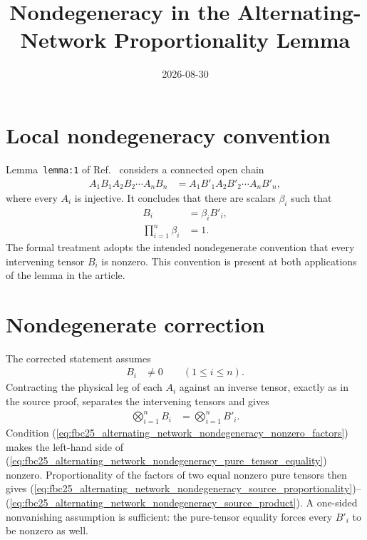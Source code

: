 \documentclass{article}
\title{Nondegeneracy in the Alternating-Network Proportionality Lemma}
\author{}
\date{2026-08-30}
\begin{document}
\maketitle
{}

\section{Local nondegeneracy convention}

Lemma~\texttt{lemma:1} of
Ref.~\cite[lines~2296--2395]{FrancoRubio2025MPUGauging} considers a connected
open chain
\begin{align}
    A_1B_1A_2B_2\cdots A_nB_n
        &=A_1B'_1A_2B'_2\cdots A_nB'_n,
    \label{eq:fbc25_alternating_network_nondegeneracy_source_equality}
\end{align}
where every $A_i$ is injective.  It concludes that there are scalars
$\beta_i$ such that
\begin{align}
    B_i&=\beta_iB'_i,
    \label{eq:fbc25_alternating_network_nondegeneracy_source_proportionality}\\
    \prod_{i=1}^n\beta_i&=1.
    \label{eq:fbc25_alternating_network_nondegeneracy_source_product}
\end{align}
The formal treatment adopts the intended nondegenerate convention that every
intervening tensor $B_i$ is nonzero.  This convention is present at both
applications of the lemma in the article.

\section{Nondegenerate correction}

The corrected statement assumes
\begin{align}
    B_i&\ne0\qquad (1\leq i\leq n).
    \label{eq:fbc25_alternating_network_nondegeneracy_nonzero_factors}
\end{align}
Contracting the physical leg of each $A_i$ against an inverse tensor, exactly
as in the source proof, separates the intervening tensors and gives
\begin{align}
    \bigotimes_{i=1}^n B_i
        &=\bigotimes_{i=1}^n B'_i.
    \label{eq:fbc25_alternating_network_nondegeneracy_pure_tensor_equality}
\end{align}
Condition
(\ref{eq:fbc25_alternating_network_nondegeneracy_nonzero_factors}) makes the
left-hand side of
(\ref{eq:fbc25_alternating_network_nondegeneracy_pure_tensor_equality})
nonzero.  Proportionality of the factors of two equal nonzero pure tensors
then gives
(\ref{eq:fbc25_alternating_network_nondegeneracy_source_proportionality})--%
(\ref{eq:fbc25_alternating_network_nondegeneracy_source_product}).  A
one-sided nonvanishing assumption is sufficient: the pure-tensor equality
forces every $B'_i$ to be nonzero as well.
\end{document}
